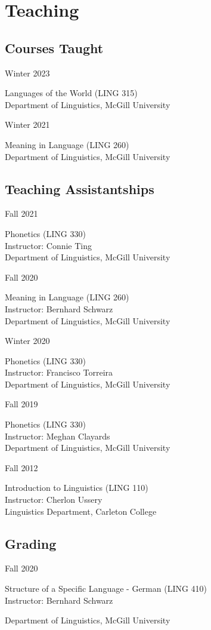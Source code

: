 \documentclass[11pt,oneside,DIV=calc,parskip=off]{scrarticle} %
\newlength{\leftcolwidth}
\newlength{\rightcolwidth}
\newlength{\spacingbefore}
\newlength{\spacingafter}
\newcommand{\mytwocol}[2]{%
	\vspace{\spacingbefore}%
	\begin{minipage}[t]{\leftcolwidth}%
		\strut#1%
	\end{minipage}%
	\begin{minipage}[t]{\rightcolwidth}%
		\strut#2%
	\end{minipage}%
	\vspace{\spacingafter}\par%
	}
\newcommand{\cvline}[2]{%
	\mytwocol{#1}{#2}%
	}
\begin{document}
\section{Teaching}

\subsection{Courses Taught}
\cvline{Winter 2023}{%
	Languages of the World (LING 315)\\
	Department of Linguistics, McGill University}
\cvline{Winter 2021}{%
	Meaning in Language (LING 260)\\
	Department of Linguistics, McGill University}
	
\subsection{Teaching Assistantships}
\cvline{Fall 2021}{%
	Phonetics (LING 330)\\
	Instructor: Connie Ting\\
	Department of Linguistics, McGill University}
\cvline{Fall 2020}{%
	Meaning in Language (LING 260)\\
	Instructor: Bernhard Schwarz\\
	Department of Linguistics, McGill University}
\cvline{Winter 2020}{%
	Phonetics (LING 330)\\
	Instructor: Francisco Torreira\\
	Department of Linguistics, McGill University}
\cvline{Fall 2019}{%
	Phonetics (LING 330)\\
	Instructor: Meghan Clayards\\
	Department of Linguistics, McGill University}
\cvline{Fall 2012}{%
	Introduction to Linguistics (LING 110)\\
	Instructor: Cherlon Ussery\\
	Linguistics Department, Carleton College}

\subsection{Grading}
\cvline{Fall 2020}{%
	Structure of a Specific Language - German (LING 410)\\
	Instructor: Bernhard Schwarz\par
	Department of Linguistics, McGill University}
\end{document}
